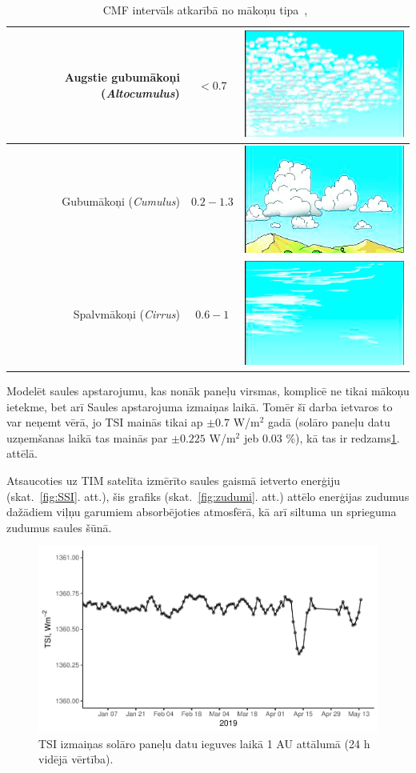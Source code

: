 \begin{table}[h]
	\caption{CMF intervāls atkarībā no mākoņu tipa~\cite{effectCloudsOnSurface},~\cite{cloudAtlas}}
	\begin{center}
		\begin{tabular}{| r | c | c |}
			\hline
			Augstie gubumākoņi (\textit{Altocumulus}) & $<0.7$ & \includegraphics[width=0.1\linewidth]{figures/meteo/cloud_Altocumulus.jpg} \\ \hline
			Gubumākoņi (\textit{Cumulus})        & $0.2-1.3$ & \includegraphics[width=0.1\linewidth]{figures/meteo/cloud_Cumulus.jpg} \\ \hline
			Spalvmākoņi (\textit{Cirrus})        & $0.6-1$  & \includegraphics[width=0.1\linewidth]{figures/meteo/cloud_Cirrus.jpg} \\ \hline
		\end{tabular}
	\end{center}
	\label{tab:CMF}
\end{table}

Modelēt saules apstarojumu, kas nonāk paneļu virsmas, komplicē ne tikai mākoņu ietekme, bet arī Saules apstarojuma izmaiņas laikā. Tomēr šī darba ietvaros to var neņemt vērā, jo TSI mainās tikai ap $\pm 0.7$ W/m$^2$ gadā (solāro paneļu datu uzņemšanas laikā tas mainās par $\pm 0.225$ W/m$^2$ jeb 0.03 \%), kā tas ir redzams\ref{fig:TSI2}. attēlā.

Atsaucoties uz TIM satelīta izmērīto saules gaismā ietverto enerģiju (skat.~\ref{fig:SSI}. att.), šis grafiks (skat.~\ref{fig:zudumi}. att.) attēlo enerģijas zudumus dažādiem viļņu garumiem absorbējoties atmosfērā, kā arī siltuma un sprieguma zudumus saules šūnā.

\begin{figure}[h]
    \centering
    \includegraphics[width=\linewidth]{figures/misc/TSI.pdf}
    \caption{TSI izmaiņas solāro paneļu datu ieguves laikā 1 AU attālumā (24 h vidējā vērtība)\cite{TSIdata}.}
    \label{fig:TSI2}
\end{figure}


